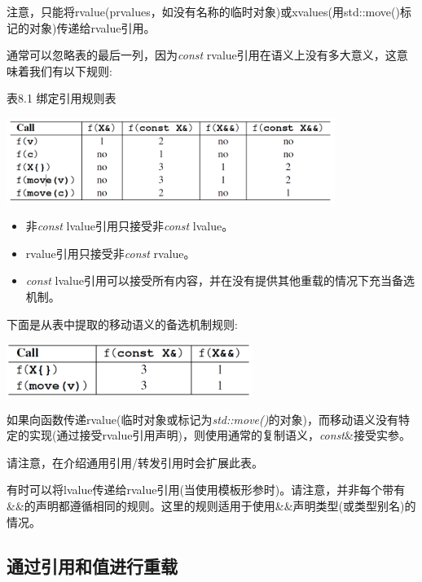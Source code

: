 注意，只能将rvalue(prvalues，如没有名称的临时对象)或xvalues(用std::move()标记的对象)传递给rvalue引用。

通常可以忽略表的最后一列，因为\textit{const} rvalue引用在语义上没有多大意义，这意味着我们有以下规则:

\hspace*{\fill}  %
表8.1 绑定引用规则表

\begin{center}
	\includegraphics[width=0.8\textwidth]{part1/ch8/images/3}
\end{center}

\begin{itemize}
	\item 非\textit{const} lvalue引用只接受非\textit{const} lvalue。
	\item rvalue引用只接受非\textit{const} rvalue。
	\item \textit{const} lvalue引用可以接受所有内容，并在没有提供其他重载的情况下充当备选机制。
\end{itemize}

下面是从表中提取的移动语义的备选机制规则:

\begin{center}
	\includegraphics[width=0.6\textwidth]{part1/ch8/images/4}
\end{center}

如果向函数传递rvalue(临时对象或标记为\textit{std::move()}的对象)，而移动语义没有特定的实现(通过接受rvalue引用声明)，则使用通常的复制语义，\textit{const}\&接受实参。

请注意，在介绍通用引用/转发引用时会扩展此表。

有时可以将lvalue传递给rvalue引用(当使用模板形参时)。请注意，并非每个带有\&\&的声明都遵循相同的规则。这里的规则适用于使用\&\&声明类型(或类型别名)的情况。

\subsection{通过引用和值进行重载}

